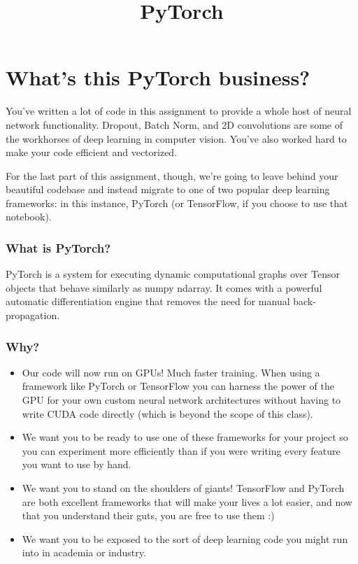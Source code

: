 \documentclass[11pt]{article}
\title{PyTorch}
\providecommand{\tightlist}{%
      \setlength{\itemsep}{0pt}\setlength{\parskip}{0pt}}
\begin{document}
    
    \maketitle
    
    

    
    \hypertarget{whats-this-pytorch-business}{%
\section{What's this PyTorch
business?}\label{whats-this-pytorch-business}}

You've written a lot of code in this assignment to provide a whole host
of neural network functionality. Dropout, Batch Norm, and 2D
convolutions are some of the workhorses of deep learning in computer
vision. You've also worked hard to make your code efficient and
vectorized.

For the last part of this assignment, though, we're going to leave
behind your beautiful codebase and instead migrate to one of two popular
deep learning frameworks: in this instance, PyTorch (or TensorFlow, if
you choose to use that notebook).

    \hypertarget{what-is-pytorch}{%
\subsubsection{What is PyTorch?}\label{what-is-pytorch}}

PyTorch is a system for executing dynamic computational graphs over
Tensor objects that behave similarly as numpy ndarray. It comes with a
powerful automatic differentiation engine that removes the need for
manual back-propagation.

\hypertarget{why}{%
\subsubsection{Why?}\label{why}}

\begin{itemize}
\tightlist
\item
  Our code will now run on GPUs! Much faster training. When using a
  framework like PyTorch or TensorFlow you can harness the power of the
  GPU for your own custom neural network architectures without having to
  write CUDA code directly (which is beyond the scope of this class).
\item
  We want you to be ready to use one of these frameworks for your
  project so you can experiment more efficiently than if you were
  writing every feature you want to use by hand.
\item
  We want you to stand on the shoulders of giants! TensorFlow and
  PyTorch are both excellent frameworks that will make your lives a lot
  easier, and now that you understand their guts, you are free to use
  them :)
\item
  We want you to be exposed to the sort of deep learning code you might
  run into in academia or industry.
\end{itemize}
\end{document}
